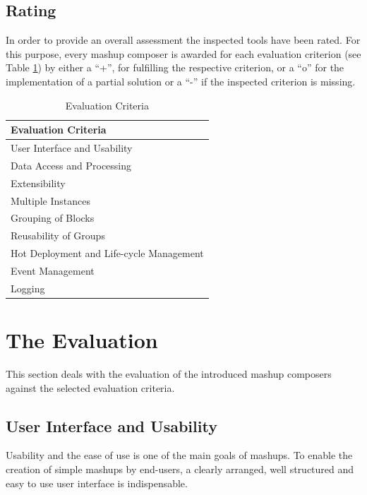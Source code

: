 \subsection{Rating}

In order to provide an overall assessment the inspected tools have been rated. For this purpose,
every mashup composer is awarded for each evaluation criterion (see Table
\ref{tab:TheEvaluationCriterions}) by either a ``+'', for fulfilling the respective criterion, or a
``o'' for the implementation of a partial solution or a ``-'' if the inspected criterion is missing.

\begin{table}[h]
	\centering
		\begin{tabular}{|l|}
			\hline
				\textbf{Evaluation Criteria}\\
				\hline\hline
				User Interface and Usability\\
				\hline
				Data Access and Processing\\
				\hline
				Extensibility\\
				\hline
				Multiple Instances\\
				\hline
				Grouping of Blocks\\
				\hline
				Reusability of Groups\\
				\hline
				Hot Deployment and Life-cycle Management\\
				\hline
				Event Management\\
				\hline
				Logging\\
			\hline
		\end{tabular}
	\caption{Evaluation Criteria}
	\label{tab:TheEvaluationCriterions}
\end{table}

\section{The Evaluation}

This section deals with the evaluation of the introduced mashup composers against the selected
evaluation criteria.
 
\subsection{User Interface and Usability}

Usability and the ease of use is one of the main goals of mashups. To enable the creation of simple
mashups by end-users, a clearly arranged, well structured and easy to use user interface is
indispensable.

